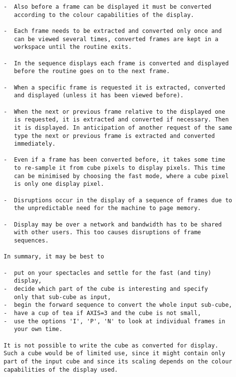 \begin{description}
\begin{verbatim}
   -  Also before a frame can be displayed it must be converted
      according to the colour capabilities of the display.

   -  Each frame needs to be extracted and converted only once and
      can be viewed several times, converted frames are kept in a
      workspace until the routine exits.

   -  In the sequence displays each frame is converted and displayed
      before the routine goes on to the next frame.

   -  When a specific frame is requested it is extracted, converted
      and displayed (unless it has been viewed before).

   -  When the next or previous frame relative to the displayed one
      is requested, it is extracted and converted if necessary. Then
      it is displayed. In anticipation of another request of the same
      type the next or previous frame is extracted and converted
      immediately.

   -  Even if a frame has been converted before, it takes some time
      to re-sample it from cube pixels to display pixels. This time
      can be minimised by choosing the fast mode, where a cube pixel
      is only one display pixel.

   -  Disruptions occur in the display of a sequence of frames due to
      the unpredictable need for the machine to page memory.

   -  Display may be over a network and bandwidth has to be shared
      with other users. This too causes disruptions of frame
      sequences.

   In summary, it may be best to

   -  put on your spectacles and settle for the fast (and tiny)
      display,
   -  decide which part of the cube is interesting and specify
      only that sub-cube as input,
   -  begin the forward sequence to convert the whole input sub-cube,
   -  have a cup of tea if AXIS=3 and the cube is not small,
   -  use the options 'I', 'P', 'N' to look at individual frames in
      your own time.

   It is not possible to write the cube as converted for display.
   Such a cube would be of limited use, since it might contain only
   part of the input cube and since its scaling depends on the colour
   capabilities of the display used.
\end{verbatim}
\end{description}
